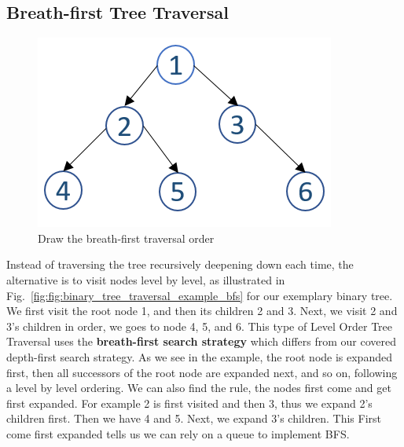 \documentclass[../main.tex]{subfiles}
\begin{document}
\subsection{Breath-first Tree Traversal}
\label{bfs_tree_traversal}
\begin{figure}[H]
    \centering
    \includegraphics[width = .45\columnwidth]{fig/binary_tree_example.png}
    \caption{Draw the breath-first traversal order }
    \label{fig:binary_tree_traversal_example_bfs}
\end{figure}
Instead of traversing the tree recursively deepening down each time, the alternative is to visit  nodes level by level, as illustrated in Fig.~\ref{fig:fig:binary_tree_traversal_example_bfs} for our exemplary binary tree. We first visit the root node 1, and then its children 2 and 3. Next, we visit 2 and 3's children in order, we goes to node 4, 5, and 6.  This type of Level Order Tree Traversal uses the \textbf{breath-first search strategy} which differs from our covered depth-first search strategy. As we see in the example, the root node is expanded first, then all successors of the root node are expanded next, and so on, following a level by level ordering. We can also find the rule, the nodes first come and get first expanded. For example 2 is first visited and then 3, thus we expand 2's children first. Then we have 4 and 5. Next, we expand 3's children. This First come first expanded tells us we can rely on a queue to implement BFS. 
\end{document}
